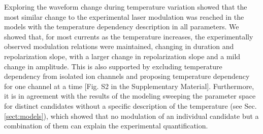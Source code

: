 Exploring the waveform change during temperature variation showed that the most similar change to the experimental laser modulation was reached in the models with the temperature dependency description in all parameters. We showed that, for most currents as the temperature increases, the experimentally observed modulation relations were maintained, changing in duration and repolarization slope, with a larger change in repolarization slope and a mild change in amplitude. This is also supported by excluding temperature dependency from isolated ion channels and proposing temperature dependency for one channel at a time [Fig. S2 in the Supplementary Material]. Furthermore, it is in agreement with the results of the modeling sweeping the parameter space for distinct candidates without a specific description of the temperature (see Sec. \ref{sect:models}), which showed that no modulation of an individual candidate but a combination of them can explain the experimental quantification.




